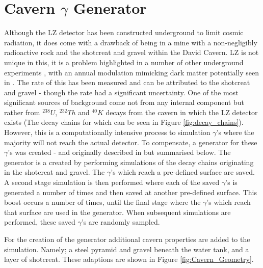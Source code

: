 \section{Cavern $\gamma$ Generator}
\label{sec:cavern_gamma_generator}

\par
Although the LZ detector has been constructed underground to limit cosmic radiation, it does come with a drawback of being in a mine with a non-negligibly radioactive rock and the shotcreat and gravel within the David Cavern.
LZ is not unique in this, it is a problem highlighted in a number of other underground experiments \cite{cavern_gamma_annual_modulation_CoGeNT_ref, cavern_gammas_in_Soudan_mine_ref}, with an annual modulation mimicking dark matter potentially seen in \cite{cavern_gamma_annual_modulation_CoGeNT_ref}.
The rate of this has been measured and can be attributed to the shotcreat and gravel \cite{LZ_Gamma_Ray_Background_ref} - though the rate had a significant uncertainty.
One of the most significant sources of background come not from any internal component but rather from $^{238}U$, $^{232}Th$ and $^{40}K$ decays from the cavern in which the LZ detector exists (The decay chains for which can be seen in Figure \ref{fig:decay_chains}).
However, this is a computationally intensive process to simulation $\gamma$'s where the majority will not reach the actual detector.
To compensate, a generator for these $\gamma$'s was created - and originally described in \cite{rg_generator_ref} but summarised below.
The generator is a created by performing simulations of the decay chains originating in the shotcreat and gravel.
The $\gamma$'s which reach a pre-defined surface are saved.
A second stage simulation is then performed where each of the saved $\gamma$'s is generated a number of times and then saved at another pre-defined surface.
This boost occurs a number of times, until the final stage where the $\gamma$'s which reach that surface are used in the generator.
When subsequent simulations are performed, these saved $\gamma$'s are randomly sampled. 

\par
For the creation of the generator additional cavern properties are added to the simulation.
Namely; a steel pyramid and gravel beneath the water tank, and a layer of shotcreat.
These adaptions are shown in Figure \ref{fig:Cavern_Geometry}.

